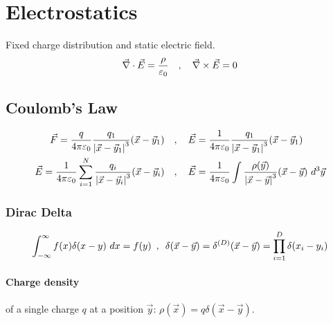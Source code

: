 \section{Electrostatics}

Fixed charge distribution and static electric field.
\begin{align*}
    \vec{\nabla} \cdot \vec{E} = \frac{\rho}{\varepsilon_0}
    \hspace{10pt} , \hspace{10pt}
    \vec{\nabla} \times \vec{E} = 0
\end{align*}

\subsection{Coulomb's Law}

\begin{align*}
    \vec{F} = \frac{q}{4 \pi \epsilonnull} \frac{q_1}{\abs{\vec{x} - \vec{y}_1}^3} (\vec{x} - \vec{y}_1)
    \hspace{10pt} &, \hspace{10pt}
    \vec{E} = \frac{1}{4 \pi \epsilonnull} \frac{q_1}{\abs{\vec{x} - \vec{y}_1}^3} (\vec{x} - \vec{y}_1)
    \\
    \vec{E} = \frac{1}{4 \pi \epsilonnull} \sum_{i=1}^N \frac{q_i}{\abs{\vec{x} - \vec{y}_i}^3} (\vec{x} - \vec{y}_i)
    \hspace{10pt} &, \hspace{10pt}
    \vec{E} = \frac{1}{4 \pi \epsilonnull} \int \frac{\rho(\vec{y})}{\abs{\vec{x} - \vec{y}}^3} (\vec{x} - \vec{y}) \ d^3 \vec{y}
\end{align*}

\subsubsection{Dirac Delta}

\begin{align*}
    \int_{-\infty}^\infty f(x) \delta(x-y) \ dx = f(y)
    \hspace{5pt} , \hspace{5pt}
    \delta (\vec{x} - \vec{y}) =
    \delta^{(D)} (\vec{x} - \vec{y}) = \prod_{i=1}^D \delta(x_i - y_i)
\end{align*}

\paragraph{Charge density} of a single charge $q$ at a position $\vec{y}$:
$\rho(\vec{x}) = q \delta(\vec{x} - \vec{y})$.

